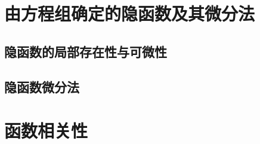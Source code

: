 \section{由方程组确定的隐函数及其微分法}
\subsection{隐函数的局部存在性与可微性}
\subsection{隐函数微分法}

\pushstar
\section{函数相关性}
\popstar

\begin{exercise}

\end{exercise}
\begin{exercise*}

\end{exercise*}




\endinput
